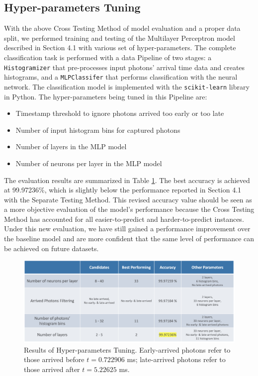 \documentclass[letterpaper,twocolumn,10pt]{article}
\begin{document}
\subsection{Hyper-parameters Tuning}

With the above Cross Testing Method of model evaluation and a proper data split, we performed training and testing of the Multilayer Perceptron model described in Section 4.1 with various set of hyper-parameters. The complete classification task is performed with a data Pipeline of two stages: a \texttt{Histogramizer} that pre-processes input photons' arrival time data and creates histograms, and a \texttt{MLPClassifer} that performs classification with the neural network. The classification model is implemented with the \texttt{scikit-learn} library in Python. The hyper-parameters being tuned in this Pipeline are:

\begin{itemize}
    \item Timestamp threshold to ignore photons arrived too early or too late
    \item Number of input histogram bins for captured photons
    \item Number of layers in the MLP model
    \item Number of neurons per layer in the MLP model
\end{itemize}

The evaluation results are summarized in Table \ref{table:params_tuning}. The best accuracy is achieved at 99.97236\%, which is slightly below the performance reported in Section 4.1 with the Separate Testing Method. This revised accuracy value should be seen as a more objective evaluation of the model's performance because the Cross Testing Method has accounted for all easier-to-predict and harder-to-predict instances. Under this new evaluation, we have still gained a performance improvement over the baseline model and are more confident that the same level of performance can be achieved on future datasets. 

\begin{figure}[]
    \includegraphics[width=2\columnwidth]{Figures/params_tuning.png}
    \centering
    \caption{Results of Hyper-parameters Tuning. Early-arrived photons refer to those arrived before $t = 0.722906$ ms; late-arrived photons refer to those arrived after $t = 5.22625$ ms.}
    \label{table:params_tuning}
\end{figure}
\end{document}
